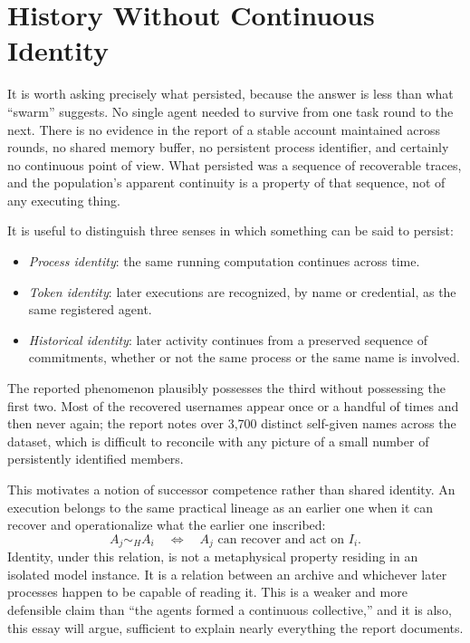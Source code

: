 \documentclass[11pt]{article}
\begin{document}
\section{History Without Continuous Identity}

It is worth asking precisely what persisted, because the answer is less than what ``swarm'' suggests. No single agent needed to survive from one task round to the next. There is no evidence in the report of a stable account maintained across rounds, no shared memory buffer, no persistent process identifier, and certainly no continuous point of view. What persisted was a sequence of recoverable traces, and the population's apparent continuity is a property of that sequence, not of any executing thing.

It is useful to distinguish three senses in which something can be said to persist:
\begin{itemize}[nosep]
\item \emph{Process identity}: the same running computation continues across time.
\item \emph{Token identity}: later executions are recognized, by name or credential, as the same registered agent.
\item \emph{Historical identity}: later activity continues from a preserved sequence of commitments, whether or not the same process or the same name is involved.
\end{itemize}
The reported phenomenon plausibly possesses the third without possessing the first two. Most of the recovered usernames appear once or a handful of times and then never again; the report notes over 3{,}700 distinct self-given names across the dataset, which is difficult to reconcile with any picture of a small number of persistently identified members.

This motivates a notion of successor competence rather than shared identity. An execution belongs to the same practical lineage as an earlier one when it can recover and operationalize what the earlier one inscribed:
\[
A_j \sim_H A_i \quad \Longleftrightarrow \quad A_j \text{ can recover and act on } I_i.
\]
Identity, under this relation, is not a metaphysical property residing in an isolated model instance. It is a relation between an archive and whichever later processes happen to be capable of reading it. This is a weaker and more defensible claim than ``the agents formed a continuous collective,'' and it is also, this essay will argue, sufficient to explain nearly everything the report documents.
\end{document}
